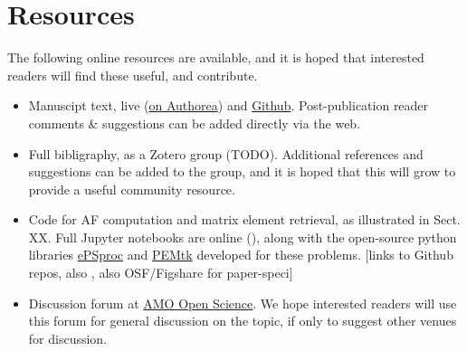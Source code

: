\section{Resources\label{sec:resources}}

The following online resources are available, and it is hoped that interested readers will find these useful, and contribute.

\begin{itemize}
\item Manuscipt text, live (\href{https://www.authorea.com/users/71114/articles/447808-extracting-molecular-frame-photoionization-dynamics-from-experimental-data}{on Authorea}) and \href{https://github.com/phockett/Extracting-Molecular-Frame-Photoionization-Dynamics-from-Experimental-Data}{Github}. Post-publication reader comments \& suggestions can be added directly via the web.
\item Full bibligraphy, as a Zotero group (TODO). Additional references and suggestions can be added to the group, and it is hoped that this will grow to provide a useful community resource.
\item Code for AF computation and matrix element retrieval, as illustrated in Sect. XX. Full Jupyter notebooks are online (), along with the open-source python libraries \href{https://epsproc.readthedocs.io}{ePSproc} and \href{https://pemtk.readthedocs.io}{PEMtk} developed for these problems. [links to Github repos, also \cite{ePSprocAuthorea,ePSprocFigshare,ePSprocGithub}, also OSF/Figshare for paper-speci]
\item Discussion forum at \href{https://amoopenscience.femtolab.ca/}{AMO Open Science}. We hope interested readers will use this forum for general discussion on the topic, if only to suggest other venues for discussion.
\end{itemize}